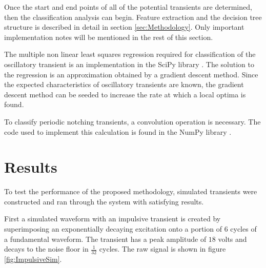 \documentclass[10pt, conference, compsocconf]{IEEEtran}
\begin{document}
Once the start and end points of all of the potential transients are determined, then the classification analysis can begin. Feature extraction and the decision tree structure is described in detail in section \ref{sec:Methodology}. Only important implementation notes will be mentioned in the rest of this section.

The multiple non linear least squares regression required for classification of the oscillatory transient is an implementation in the SciPy library \cite{scipy:2019}. The solution to the regression is an approximation obtained by a gradient descent method. Since the expected characteristics of oscillatory transients are known, the gradient descent method can be seeded to increase the rate at which a local optima is found.

To classify periodic notching transients, a convolution operation is necessary. The code used to implement this calculation is found in the NumPy library \cite{numpy}.

\section{Results}
\label{sec:Results}
To test the performance of the proposed methodology, simulated transients were constructed and ran through the system with satisfying results.

First a simulated waveform with an impulsive transient is created by superimposing an exponentially decaying excitation onto a portion of $6$ cycles of a fundamental waveform. The transient has a peak amplitude of $18$ volts and decays to the noise floor in $\frac{1}{32}$ cycles. The raw signal is shown in figure \ref{fig:ImpulsiveSim}.
\end{document}
